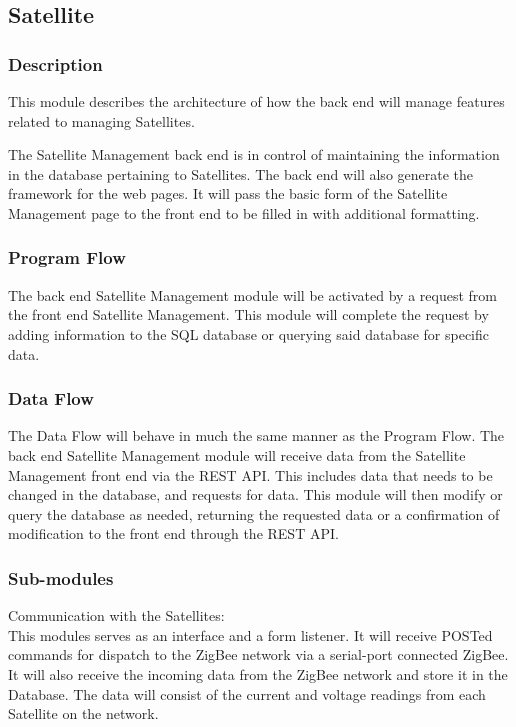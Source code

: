 
\subsection{Satellite}

\subsubsection{Description}

This module describes the architecture of how the back end will manage features related to managing Satellites. 

The Satellite Management back end is in control of maintaining the information in the database pertaining to Satellites. 
The back end will also generate the framework for the web pages. 
It will pass the basic form of the Satellite Management page to the front end to be filled in with additional formatting. 

\subsubsection{Program Flow}

The back end Satellite Management module will be activated by a request from the front end Satellite Management. 
This module will complete the request by adding information to the \ac{SQL} database or querying said database for specific data. 

\subsubsection{Data Flow}

The Data Flow will behave in much the same manner as the Program Flow. 
The back end Satellite Management module will receive data from the Satellite Management front end via the \ac{REST} \ac{API}. 
This includes data that needs to be changed in the database, and requests for data. 
This module will then modify or query the database as needed, 
returning the requested data or a confirmation of modification to the front end through the \ac{REST} \ac{API}. 

\subsubsection{Sub-modules}
Communication with the Satellites:\\
This modules serves as an interface and a form listener. 
It will receive \ac{POST}ed commands for dispatch to the ZigBee network via a serial-port connected ZigBee. 
It will also receive the incoming data from the ZigBee network and store it in the Database. 
The data will consist of the current and voltage readings from each Satellite on the network. 

